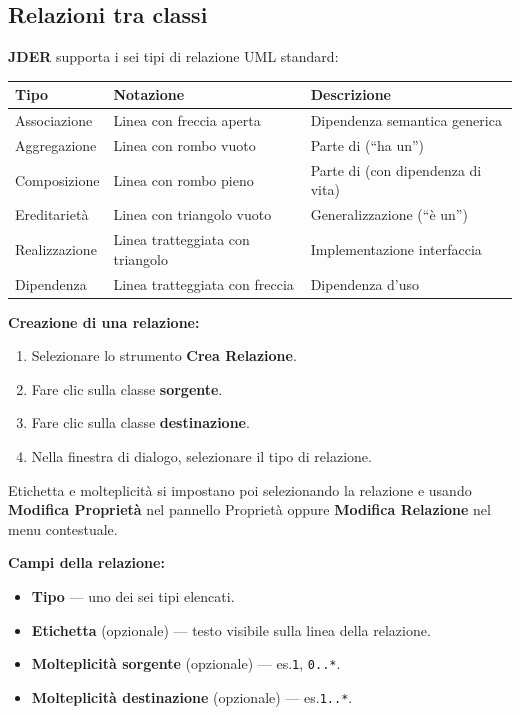 \documentclass[a4paper,11pt]{article}
\newcommand{\uielement}[1]{\textbf{#1}}
\newcommand{\jder}{\textbf{JDER}}
\begin{document}
\subsection{Relazioni tra classi}

\jder{} supporta i sei tipi di relazione UML standard:

\begin{center}
\begin{tabular}{@{}lll@{}}
  \toprule
  \textbf{Tipo} & \textbf{Notazione} & \textbf{Descrizione} \\
  \midrule
  Associazione  & Linea con freccia aperta & Dipendenza semantica generica \\
  Aggregazione  & Linea con rombo vuoto    & Parte di (``ha un'') \\
  Composizione  & Linea con rombo pieno    & Parte di (con dipendenza di vita) \\
  Ereditarietà  & Linea con triangolo vuoto & Generalizzazione (``è un'') \\
  Realizzazione & Linea tratteggiata con triangolo & Implementazione interfaccia \\
  Dipendenza    & Linea tratteggiata con freccia & Dipendenza d'uso \\
  \bottomrule
\end{tabular}
\end{center}

\textbf{Creazione di una relazione:}
\begin{enumerate}
  \item Selezionare lo strumento \uielement{Crea Relazione}.
  \item Fare clic sulla classe \textbf{sorgente}.
  \item Fare clic sulla classe \textbf{destinazione}.
  \item Nella finestra di dialogo, selezionare il tipo di relazione.
\end{enumerate}

Etichetta e molteplicità si impostano poi selezionando la relazione e usando
\uielement{Modifica Proprietà} nel pannello Proprietà oppure \uielement{Modifica Relazione} nel
menu contestuale.

\textbf{Campi della relazione:}
\begin{itemize}
  \item \textbf{Tipo} --- uno dei sei tipi elencati.
  \item \textbf{Etichetta} (opzionale) --- testo visibile sulla linea della relazione.
  \item \textbf{Molteplicità sorgente} (opzionale) --- es.\@ \texttt{1}, \texttt{0..*}.
  \item \textbf{Molteplicità destinazione} (opzionale) --- es.\@ \texttt{1..*}.
\end{itemize}
\end{document}
